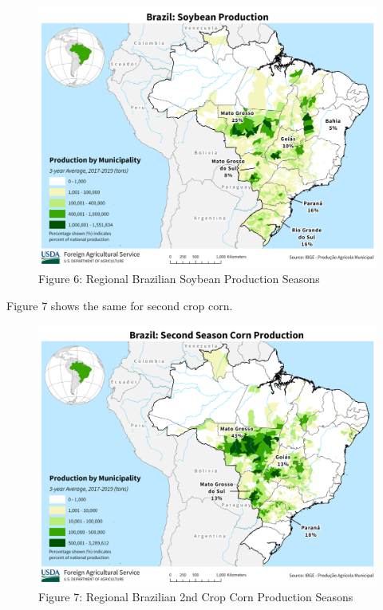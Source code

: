 \documentclass[
  letterpaper,
  DIV=11,
  numbers=noendperiod]{scrreprt}
\begin{document}
\begin{figure}[H]

{\centering \includegraphics{assets/Brazil_Soybean.png}

}

\caption{Figure 6: Regional Brazilian Soybean Production Seasons}

\end{figure}%

Figure 7 shows the same for second crop corn.

\begin{figure}[H]

{\centering \includegraphics{assets/Brazil_SecondSeason_Corn.png}

}

\caption{Figure 7: Regional Brazilian 2nd Crop Corn Production Seasons}

\end{figure}%
\end{document}
